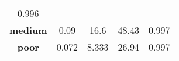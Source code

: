 \documentclass[]{article}
\begin{document}
\begin{longtable}[]{@{}ccccc@{}}
\begin{minipage}[t]{0.10\columnwidth}
0.996\strut
\end{minipage}\tabularnewline
\begin{minipage}[t]{0.14\columnwidth}\centering\strut
\textbf{medium}\strut
\end{minipage} & \begin{minipage}[t]{0.13\columnwidth}\centering\strut
0.09\strut
\end{minipage} & \begin{minipage}[t]{0.24\columnwidth}\centering\strut
16.6\strut
\end{minipage} & \begin{minipage}[t]{0.25\columnwidth}\centering\strut
48.43\strut
\end{minipage} & \begin{minipage}[t]{0.10\columnwidth}\centering\strut
0.997\strut
\end{minipage}\tabularnewline
\begin{minipage}[t]{0.14\columnwidth}\centering\strut
\textbf{poor}\strut
\end{minipage} & \begin{minipage}[t]{0.13\columnwidth}\centering\strut
0.072\strut
\end{minipage} & \begin{minipage}[t]{0.24\columnwidth}\centering\strut
8.333\strut
\end{minipage} & \begin{minipage}[t]{0.25\columnwidth}\centering\strut
26.94\strut
\end{minipage} & \begin{minipage}[t]{0.10\columnwidth}\centering\strut
0.997\strut
\end{minipage}\tabularnewline
\bottomrule
\end{longtable}
\end{document}
